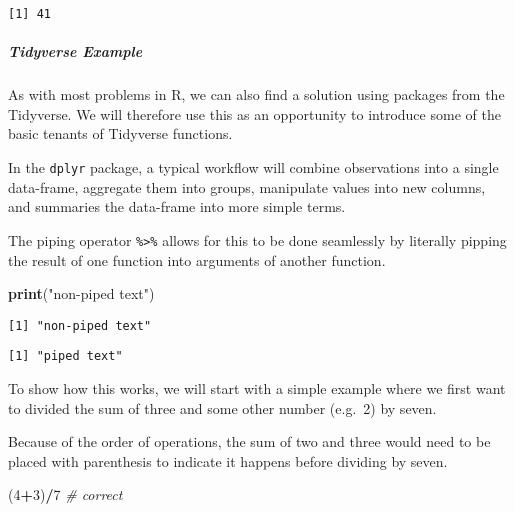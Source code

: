 \documentclass[12pt,]{article}
\newenvironment{Shaded}{\begin{snugshade}}{\end{snugshade}}
\newcommand{\CommentTok}[1]{\textcolor[rgb]{0.56,0.35,0.01}{\textit{#1}}}
\newcommand{\DecValTok}[1]{\textcolor[rgb]{0.00,0.00,0.81}{#1}}
\newcommand{\KeywordTok}[1]{\textcolor[rgb]{0.13,0.29,0.53}{\textbf{#1}}}
\newcommand{\NormalTok}[1]{#1}
\newcommand{\OperatorTok}[1]{\textcolor[rgb]{0.81,0.36,0.00}{\textbf{#1}}}
\newcommand{\StringTok}[1]{\textcolor[rgb]{0.31,0.60,0.02}{#1}}
\let\oldsubparagraph\subparagraph
\renewcommand{\subparagraph}[1]{\oldsubparagraph{#1}\mbox{}}
\begin{document}
\begin{verbatim}
[1] 41
\end{verbatim}

\hypertarget{tidyverse-example}{%
\subparagraph{Tidyverse Example}\label{tidyverse-example}}

As with most problems in R, we can also find a solution using packages
from the Tidyverse. We will therefore use this as an opportunity to
introduce some of the basic tenants of Tidyverse functions.

In the \texttt{dplyr} package, a typical workflow will combine
observations into a single data-frame, aggregate them into groups,
manipulate values into new columns, and summaries the data-frame into
more simple terms.

The piping operator \texttt{\%\textgreater{}\%} allows for this to be
done seamlessly by literally pipping the result of one function into
arguments of another function.

\begin{Shaded}
\begin{Highlighting}[]
\KeywordTok{print}\NormalTok{(}\StringTok{"non-piped text"}\NormalTok{)}
\end{Highlighting}
\end{Shaded}

\begin{verbatim}
[1] "non-piped text"
\end{verbatim}

\begin{Shaded}
\end{Shaded}

\begin{verbatim}
[1] "piped text"
\end{verbatim}

To show how this works, we will start with a simple example where we
first want to divided the sum of three and some other number (e.g.~2) by
seven.

Because of the order of operations, the sum of two and three would need
to be placed with parenthesis to indicate it happens before dividing by
seven.

\begin{Shaded}
\begin{Highlighting}[]
\NormalTok{(}\DecValTok{4}\OperatorTok{+}\DecValTok{3}\NormalTok{)}\OperatorTok{/}\DecValTok{7} \CommentTok{# correct}
\end{Highlighting}
\end{Shaded}
\end{document}
